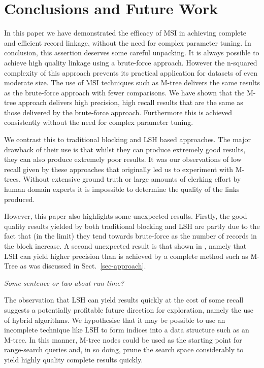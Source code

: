 \documentclass{llncs}
\begin{document}

\section{Conclusions and Future Work\label{sec-concl}}

In this paper we have demonstrated the efficacy of MSI in achieving  complete and efficient record linkage, without the need for complex parameter tuning. In conclusion, this assertion deserves some careful unpacking. It is always possible to achieve high quality linkage using a brute-force approach. However the n-squared complexity of this approach prevents its practical application for datasets of even moderate size. The use of MSI techniques such as M-tree delivers the same results as the brute-force approach with fewer comparisons. We have shown that the M-tree approach delivers high precision, high recall results that are the same as those delivered by the brute-force approach. Furthermore this is achieved consistently without the need for complex parameter tuning.

We contrast this to traditional blocking and LSH based approaches. The major drawback of their use is that whilst they can produce extremely good results, they can also produce extremely poor results. It was our observations of low recall given by these approaches that originally led us to experiment with M-trees. Without extensive ground truth or large amounts of clerking effort by human domain experts it is impossible to determine the quality of the links produced. 

However, this paper also highlights some unexpected results. Firstly, the good quality results yielded by both traditional blocking and LSH are partly due to the fact that (in the limit) they tend towards brute-force as the number of records in the block increase. A second unexpected result is that shown in , namely that LSH can yield higher precision than is achieved by a complete method such as M-Tree as was discussed in Sect.~\ref{sec-approach}.


\emph{Some sentence or two about run-time?}

The observation that LSH can yield results quickly at the cost of some recall suggests a potentially profitable future direction for exploration, namely the use of hybrid algorithms. We hypothesise that it may be possible to use an incomplete technique like LSH to form indices into a data structure such as an M-tree. In this manner, M-tree nodes could be used as the starting point for range-search queries and, in so doing, prune the search space considerably to yield highly quality complete results quickly.




 

\end{document}
